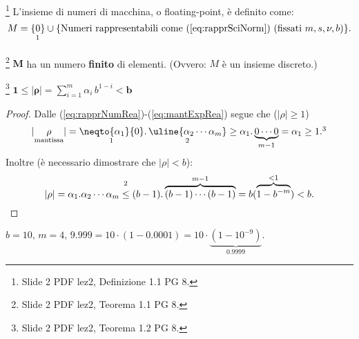 \begin{definition}\footnote{Slide 2 PDF lez2, Definizione 1.1 PG 8.}
	L'insieme di numeri di macchina, o floating-point, è definito come:
	\begin{equation}
		M = \underset{\footnotemark}{\{0\}}\cup \{\text{Numeri rappresentabili come (\ref{eq:rapprSciNorm}) (fissati }m,s,\nu, b) \}.
	\end{equation}
\end{definition}

\begin{theorem}\footnote{Slide 2 PDF lez2, Teorema 1.1 PG 8.}
	$\boldsymbol M$ ha un numero \textbf{finito} di elementi. (Ovvero: $M$ è un insieme discreto.)
\end{theorem}

\begin{theorem}\footnote{Slide 2 PDF lez2, Teorema 1.2 PG 8.}
	$\boldsymbol{1\leq |\rho|}=\sum_{i=1}^m \alpha_i\, b^{1-i}\boldsymbol{<b}$
\end{theorem}
\begin{proof}
	Dalle (\ref{eq:rapprNumRea})-(\ref{eq:mantExpRea}) segue che ($|\rho|\geq 1$)
	\begin{equation*}
		|\underset{\text{mantissa}}{\rho}|= \underset{\footnotemark}{\neqto{\alpha_1}{0}}.\,\underset{\footnotemark}{\uline{\alpha_2\cdots\alpha_m}}\geq\alpha_1.\underbrace{0\cdots 0}_{m-1}=\alpha_1\geq 1.\footnotemark
	\end{equation*}
	Inoltre (è necessario dimostrare che $|\rho|<b$):
	\begin{equation*}
		|\rho|=\alpha_1.\alpha_2\cdots\alpha_m\overset{\footnotemark}{\leq}(b-1).\overbrace{(b-1)\cdots (b-1)}^{m-1}=b(\overbrace{1-b^{-m}}^{<1})<b.
	\end{equation*}
\end{proof}
\addtocounter{footnote}{-3}




\begin{example}
	$b=10,\, m=4,\, 9.999=10\cdot(1-0.0001)=10\cdot\underbrace{(1-10^{-9})}_{0.9999}.$
\end{example}

